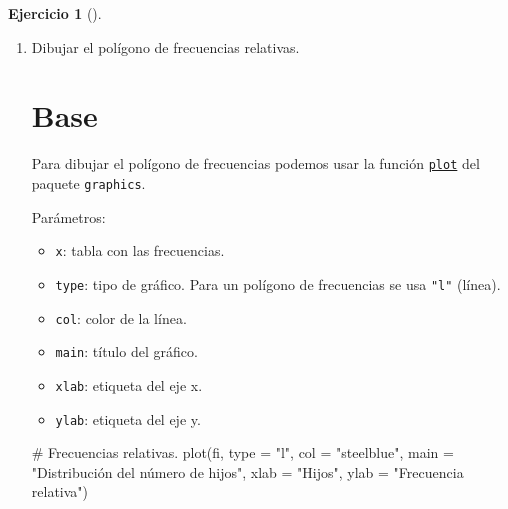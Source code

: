 \documentclass[
  a4paper,
]{scrreport}
\newenvironment{Shaded}{\begin{snugshade}}{\end{snugshade}}
\newcommand{\AttributeTok}[1]{\textcolor[rgb]{0.40,0.45,0.13}{#1}}
\newcommand{\CommentTok}[1]{\textcolor[rgb]{0.37,0.37,0.37}{#1}}
\newcommand{\FunctionTok}[1]{\textcolor[rgb]{0.28,0.35,0.67}{#1}}
\newcommand{\NormalTok}[1]{\textcolor[rgb]{0.00,0.23,0.31}{#1}}
\newcommand{\StringTok}[1]{\textcolor[rgb]{0.13,0.47,0.30}{#1}}
\providecommand{\tightlist}{%
  \setlength{\itemsep}{0pt}\setlength{\parskip}{0pt}}\usepackage{longtable,booktabs,array}
\theoremstyle{definition}
\newtheorem{exercise}{Ejercicio}[chapter]
\theoremstyle{remark}
\begin{document}
\begin{exercise}[]
\begin{enumerate}
\begin{tcolorbox}
  \end{tcolorbox}
\item
  Dibujar el polígono de frecuencias relativas.

  \begin{tcolorbox}[enhanced jigsaw, colframe=quarto-callout-tip-color-frame, toprule=.15mm, bottomtitle=1mm, breakable, opacitybacktitle=0.6, toptitle=1mm, colback=white, bottomrule=.15mm, title=\textcolor{quarto-callout-tip-color}{\faLightbulb}\hspace{0.5em}{Solución}, arc=.35mm, left=2mm, titlerule=0mm, rightrule=.15mm, coltitle=black, leftrule=.75mm, opacityback=0, colbacktitle=quarto-callout-tip-color!10!white]

  \section{Base}

  Para dibujar el polígono de frecuencias podemos usar la función
  \href{https://www.rdocumentation.org/packages/graphics/versions/3.6.2/topics/plot}{\texttt{plot}}
  del paquete \texttt{graphics}.

  Parámetros:

  \begin{itemize}
  \tightlist
  \item
    \texttt{x}: tabla con las frecuencias.
  \item
    \texttt{type}: tipo de gráfico. Para un polígono de frecuencias se
    usa \texttt{"l"} (línea).
  \item
    \texttt{col}: color de la línea.
  \item
    \texttt{main}: título del gráfico.
  \item
    \texttt{xlab}: etiqueta del eje x.
  \item
    \texttt{ylab}: etiqueta del eje y.
  \end{itemize}

\begin{Shaded}
\begin{Highlighting}[]
\CommentTok{\# Frecuencias relativas.}
\FunctionTok{plot}\NormalTok{(fi, }\AttributeTok{type =} \StringTok{"l"}\NormalTok{, }\AttributeTok{col =} \StringTok{"steelblue"}\NormalTok{, }\AttributeTok{main =} \StringTok{"Distribución del número de hijos"}\NormalTok{, }\AttributeTok{xlab =} \StringTok{"Hijos"}\NormalTok{, }\AttributeTok{ylab =} \StringTok{"Frecuencia relativa"}\NormalTok{)}
\end{Highlighting}
\end{Shaded}


\end{tcolorbox}
\end{enumerate}
\end{exercise}
\end{document}
